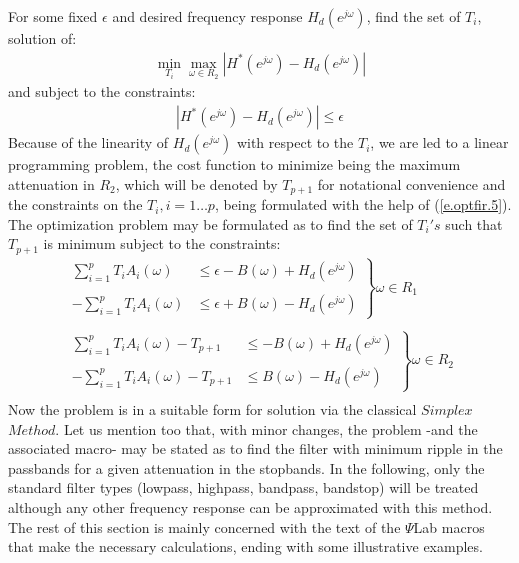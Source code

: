 {For some fixed $\epsilon$ and desired frequency response $H_{d}(e^{j\omega})$, 
find the set of ${T_i}$, solution of: 
\begin{eqnarray}
\min_{T_i}\max_{\omega \in R_2}|H^{*}(e^{j\omega}) - H_{d}(e^{j\omega})|
\label{e.optfir.4}
\end{eqnarray}
and subject to the constraints: 
\begin{eqnarray}
|H^{*}(e^{j\omega}) - H_{d}(e^{j\omega})| \leq \epsilon
\label{e.optfir.5}
\end{eqnarray}
Because of the linearity of $H_{d}(e^{j\omega})$ with respect to the $T_i$, 
we are led to a linear programming problem, the cost function to minimize 
being the maximum attenuation in $R_2$, which will be denoted by $T_{p+1}$ 
for notational convenience and the constraints on the $T_i , i=1 \ldots p$, 
being formulated with the help of (\ref{e.optfir.5}). The optimization 
problem may be formulated as to find the set of $T_i's$ such that 
$T_{p+1}$ is minimum subject to the constraints:
\[
\begin{array}{c}
\left.
\begin{array}{cc}
\sum_{i=1}^pT_iA_i(\omega) & \leq  \epsilon-B(\omega)+H_{d}(e^{j\omega})\\ \\
-\sum_{i=1}^pT_iA_i(\omega) & \leq  \epsilon+B(\omega)-H_{d}(e^{j\omega})
\end{array}
\right \} \omega \in R_1\\ \\
\left .
\begin{array}{cc} 
\sum_{i=1}^pT_iA_i(\omega)-T_{p+1} & \leq  -B(\omega)+H_{d}(e^{j\omega})\\ \\
-\sum_{i=1}^pT_iA_i(\omega)-T_{p+1} & \leq  B(\omega)-H_{d}(e^{j\omega})
\end{array}
\right \} \omega \in R_2\\
\end{array}
\]
Now the problem is in a suitable form for solution via the classical 
$Simplex$ $Method$. Let us mention too that, with minor changes, the 
problem -and the associated macro- may be stated as to find the filter 
with minimum ripple in 
the passbands for a given attenuation in the stopbands.
In the following, only the standard filter types (lowpass, 
highpass, bandpass, bandstop) will be treated although any other frequency 
response can be approximated with this method. The rest of this section 
is mainly concerned with the text of the $\Psi$Lab macros that make the 
necessary calculations, ending with some illustrative examples.

}
